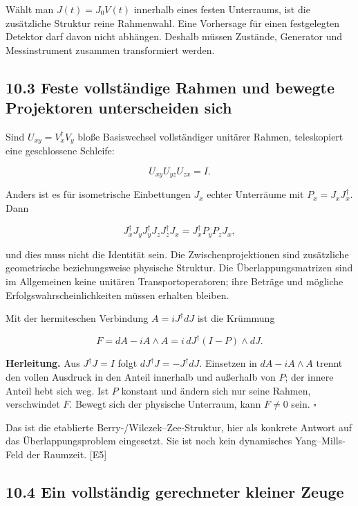 Wählt man \(J(t)=J_0V(t)\) innerhalb eines festen Unterraums, ist die
zusätzliche Struktur reine Rahmenwahl. Eine Vorhersage für einen
festgelegten Detektor darf davon nicht abhängen. Deshalb müssen
Zustände, Generator und Messinstrument zusammen transformiert werden.

\subsection{10.3 Feste vollständige Rahmen und bewegte Projektoren
unterscheiden
sich}\label{feste-vollstuxe4ndige-rahmen-und-bewegte-projektoren-unterscheiden-sich}

Sind \(U_{xy}=V_x^\dagger V_y\) bloße Basiswechsel vollständiger
unitärer Rahmen, teleskopiert eine geschlossene Schleife:

\[U_{xy}U_{yz}U_{zx}=I.\]

Anders ist es für isometrische Einbettungen \(J_x\) echter Unterräume
mit \(P_x=J_xJ_x^\dagger\). Dann

\[J_x^\dagger J_yJ_y^\dagger J_zJ_z^\dagger J_x
=J_x^\dagger P_yP_zJ_x,\]

und dies muss nicht die Identität sein. Die Zwischenprojektionen sind
zusätzliche geometrische beziehungsweise physische Struktur. Die
Überlappungsmatrizen sind im Allgemeinen keine unitären
Transportoperatoren; ihre Beträge und mögliche
Erfolgswahrscheinlichkeiten müssen erhalten bleiben.

Mit der hermiteschen Verbindung \(A=iJ^\dagger dJ\) ist die Krümmung

\[\boxed{F=dA-iA\wedge A
=i\,dJ^\dagger(I-P)\wedge dJ.}\]

\textbf{Herleitung.} Aus \(J^\dagger J=I\) folgt
\(dJ^\dagger J=-J^\dagger dJ\). Einsetzen in \(dA-iA\wedge A\) trennt
den vollen Ausdruck in den Anteil innerhalb und außerhalb von \(P\); der
innere Anteil hebt sich weg. Ist \(P\) konstant und ändern sich nur
seine Rahmen, verschwindet \(F\). Bewegt sich der physische Unterraum,
kann \(F\ne0\) sein. \(\square\)

Das ist die etablierte Berry-/Wilczek--Zee-Struktur, hier als konkrete
Antwort auf das Überlappungsproblem eingesetzt. Sie ist noch kein
dynamisches Yang--Mills-Feld der Raumzeit. {[}E5{]}

\subsection{10.4 Ein vollständig gerechneter kleiner
Zeuge}\label{ein-vollstuxe4ndig-gerechneter-kleiner-zeuge}

